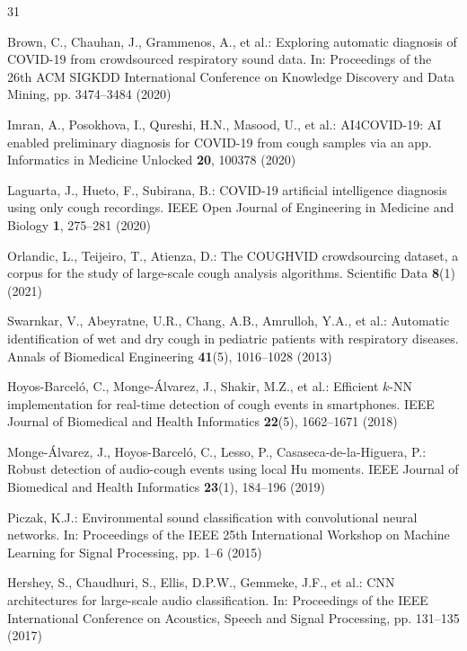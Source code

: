 \backmatter

\begin{thebibliography}{31}

Brown, C., Chauhan, J., Grammenos, A., et al.: Exploring automatic diagnosis
of COVID-19 from crowdsourced respiratory sound data. In: Proceedings of the
26th ACM SIGKDD International Conference on Knowledge Discovery and Data
Mining, pp. 3474--3484 (2020)

Imran, A., Posokhova, I., Qureshi, H.N., Masood, U., et al.: AI4COVID-19: AI
enabled preliminary diagnosis for COVID-19 from cough samples via an app.
Informatics in Medicine Unlocked \textbf{20}, 100378 (2020)

Laguarta, J., Hueto, F., Subirana, B.: COVID-19 artificial intelligence
diagnosis using only cough recordings. IEEE Open Journal of Engineering in
Medicine and Biology \textbf{1}, 275--281 (2020)

Orlandic, L., Teijeiro, T., Atienza, D.: The COUGHVID crowdsourcing dataset, a
corpus for the study of large-scale cough analysis algorithms. Scientific Data
\textbf{8}(1) (2021)

Swarnkar, V., Abeyratne, U.R., Chang, A.B., Amrulloh, Y.A., et al.: Automatic
identification of wet and dry cough in pediatric patients with respiratory
diseases. Annals of Biomedical Engineering \textbf{41}(5), 1016--1028 (2013)

Hoyos-Barcel\'o, C., Monge-\'Alvarez, J., Shakir, M.Z., et al.: Efficient
$k$-NN implementation for real-time detection of cough events in smartphones.
IEEE Journal of Biomedical and Health Informatics \textbf{22}(5), 1662--1671
(2018)

Monge-\'Alvarez, J., Hoyos-Barcel\'o, C., Lesso, P., Casaseca-de-la-Higuera,
P.: Robust detection of audio-cough events using local Hu moments. IEEE
Journal of Biomedical and Health Informatics \textbf{23}(1), 184--196 (2019)

Piczak, K.J.: Environmental sound classification with convolutional neural
networks. In: Proceedings of the IEEE 25th International Workshop on Machine
Learning for Signal Processing, pp. 1--6 (2015)

Hershey, S., Chaudhuri, S., Ellis, D.P.W., Gemmeke, J.F., et al.: CNN
architectures for large-scale audio classification. In: Proceedings of the
IEEE International Conference on Acoustics, Speech and Signal Processing,
pp. 131--135 (2017)


\end{thebibliography}
